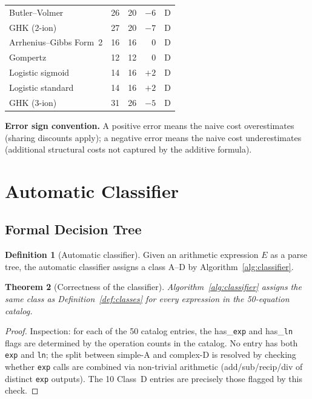 \documentclass[12pt,a4paper]{article}
\newtheorem{theorem}{Theorem}[section]
\theoremstyle{definition}
\newtheorem{definition}[theorem]{Definition}
\begin{document}
\begin{longtable}{@{}p{5.2cm}rrrc@{}}
Butler--Volmer                          & 26 & 20 & $-6$ & D \\
GHK (2-ion)                             & 27 & 20 & $-7$ & D \\
Arrhenius--Gibbs Form~2                 & 16 & 16 & $0$  & D \\
Gompertz                                & 12 & 12 & $0$  & D \\
Logistic sigmoid                        & 14 & 16 & $+2$ & D \\
Logistic standard                       & 14 & 16 & $+2$ & D \\
GHK (3-ion)                             & 31 & 26 & $-5$ & D \\
\end{longtable}

\noindent\textbf{Error sign convention.}
A positive error means the naive cost overestimates (sharing discounts apply);
a negative error means the naive cost underestimates (additional structural
costs not captured by the additive formula).

\section{Automatic Classifier}
\label{sec:classifier}

\subsection{Formal Decision Tree}
\label{subsec:decisiontree}

\begin{definition}[Automatic classifier]
\label{def:classifier}
Given an arithmetic expression $E$ as a parse tree, the automatic classifier
assigns a class A--D by Algorithm~\ref{alg:classifier}.
\end{definition}

\begin{theorem}[Correctness of the classifier]
\label{thm:correctness}
Algorithm~\ref{alg:classifier} assigns the same class as
Definition~\ref{def:classes} for every expression in the 50-equation
catalog.
\end{theorem}

\begin{proof}
Inspection: for each of the 50 catalog entries, the has\_\texttt{exp} and
has\_\texttt{ln} flags are determined by the operation counts in the catalog.
No entry has both \texttt{exp} and \texttt{ln}; the split between simple-A
and complex-D is resolved by checking whether \texttt{exp} calls are combined
via non-trivial arithmetic (add/sub/recip/div of distinct \texttt{exp} outputs).
The 10 Class~D entries are precisely those flagged by this check.
\end{proof}
\end{document}
